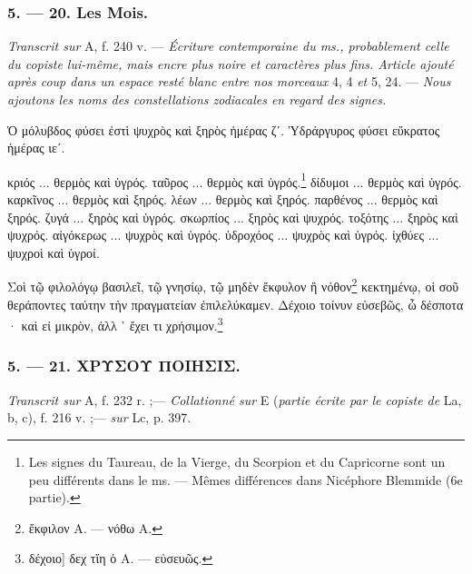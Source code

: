 \documentclass[a4paper, 11pt, oneside, polutonikogreek, french]{article}
\begin{document}
\bigskip
\centerline{\EightStarTaper}
\centerline{\EightStarTaper\EightStarTaper}
\bigskip

\subsubsection{5. --- 20. Les Mois.}

\emph{Transcrit sur} A, f. 240 v. --- \emph{Écriture contemporaine du ms., probablement celle du copiste lui-même, mais encre plus noire et caractères plus fins. Article ajouté après coup dans un espace resté blanc entre nos morceaux} 4, 4 \emph{et} 5, 24. --- \emph{Nous ajoutons les noms des constellations zodiacales en regard des signes.}

Ὁ μόλυβδος φύσει ἐστὶ ψυχρὸς καὶ ξηρὸς ἡμέρας ζʹ. Ὑδράργυρος φύσει εὔκρατος ἡμέρας ιεʹ.

κριός ...  θερμὸς καὶ ὑγρός.  
ταῦρος ... \taurus θερμὸς καὶ ὑγρός.\footnote{Les signes du Taureau, de la Vierge, du Scorpion et du Capricorne sont un peu différents dans le ms. --- Mêmes différences dans Nicéphore Blemmide (6e partie).}  
δίδυμοι ... \gemini θερμὸς καὶ ὑγρός.  
καρκῖνος ... \cancer θερμὸς καὶ ξηρός.  
λέων ... \leo θερμὸς καὶ ξηρός.  
παρθένος ... \scorpio θερμὸς καὶ ξηρός.  
ζυγά ... \libra ξηρὸς καὶ ὑγρός.  
σκωρπίος ... \virgo ξηρὸς καὶ ψυχρός.  
τοξότης ... \sagittarius ξηρὸς καὶ ψυχρός.  
αἰγόκερως ... \capricornus ψυχρὸς καὶ ὑγρός.  
ὑδροχόος ... \aquarius ψυχρὸς καὶ ὑγρός.  
ἰχθύες ... \pisces ψυχροὶ καὶ ὑγροί.  

Σοὶ τῷ φιλολόγῳ βασιλεῖ, τῷ γνησίῳ, τῷ μηδὲν ἔκφυλον ἢ νόθον\footnote{ἔκφιλον A. --- νόθω A.} κεκτημένῳ, οἱ σοῦ θεράποντες ταύτην τὴν πραγματείαν ἐπιλελύκαμεν. Δέχοιο τοίνυν εὐσεβῶς, ὦ δέσποτα · καὶ εἰ μικρὸν, ἀλλ ᾽ ἔχει τι χρήσιμον.\footnote{δέχοιο] δεχ τἴη ὁ A. --- εὐσευῶς.}

\bigskip
\centerline{\EightStarTaper}
\centerline{\EightStarTaper\EightStarTaper}
\bigskip

\subsubsection{5. --- 21. ΧΡΥΣΟΥ ΠΟΙΗΣΙΣ.}

\emph{Transcrit sur} A, f. 232 r. ;--- \emph{Collationné sur} E (\emph{partie écrite par le copiste de} La, b, c), f. 216 v. ;--- \emph{sur} Lc, p. 397.
\end{document}
